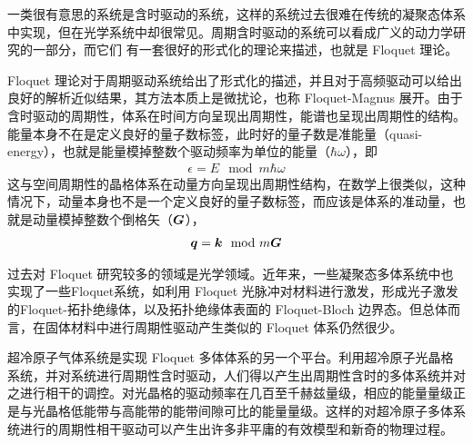 一类很有意思的系统是含时驱动的系统，这样的系统过去很难在传统的凝聚态体系中实现，但在光学系统中却很常见。周期含时驱动的系统可以看成广义的动力学研究的一部分，而它们
有一套很好的形式化的理论来描述，也就是 Floquet 理论\cite{floquet2017}。

Floquet 理论对于周期驱动系统给出了形式化的描述，并且对于高频驱动可以给出良好的解析近似结果\cite{highfreq2015}，其方法本质上是微扰论，也称 Floquet-Magnus 展开\cite{floquet-magnus-2001}。由于含时驱动的周期性，体系在时间方向呈现出周期性，能谱也呈现出周期性的结构。能量本身不在是定义良好的量子数标签，此时好的量子数是准能量（quasi-energy），也就是能量模掉整数个驱动频率为单位的能量（$\hbar\omega$），即
\begin{align}
\epsilon = E \mod m\hbar\omega
\end{align}
这与空间周期性的晶格体系在动量方向呈现出周期性结构，在数学上很类似，这种情况下，动量本身也不是一个定义良好的量子数标签，而应该是体系的准动量，也就是动量模掉整数个倒格矢（$\boldsymbol{G}$），
\begin{align}
\boldsymbol{q} = \boldsymbol{k} \mod m \boldsymbol{G}
\end{align}

过去对 Floquet 研究较多的领域是光学领域\cite{shirley1965,sambe1973}。近年来，一些凝聚态多体系统中也实现了一些Floquet系统，如利用 Floquet 光脉冲对材料进行激发，形成光子激发的Floquet-拓扑绝缘体\cite{photon-floq-2013}，以及拓扑绝缘体表面的 Floquet-Bloch 边界态\cite{floq-bloch-2013}。但总体而言，在固体材料中进行周期性驱动产生类似的 Floquet 体系仍然很少。

超冷原子气体系统是实现 Floquet 多体体系的另一个平台。利用超冷原子光晶格系统，并对系统进行周期性含时驱动，人们得以产生出周期性含时的多体系统并对之进行相干的调控\cite{floquet2017}。对光晶格的驱动频率在几百至千赫兹量级，相应的能量量级正是与光晶格低能带与高能带的能带间隙可比的能量量级。这样的对超冷原子多体系统进行的周期性相干驱动可以产生出许多非平庸的有效模型和新奇的物理过程。

